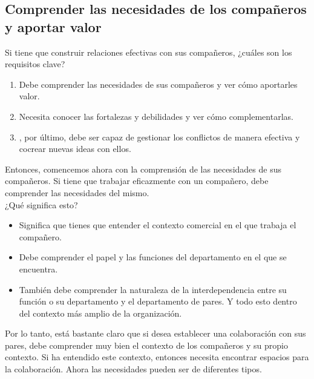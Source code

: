 \documentclass[10pt]{book}
\begin{document}
\subsection{Comprender las necesidades de los compañeros y aportar valor}
Si tiene que construir relaciones efectivas con sus compañeros, ¿cuáles son los requisitos clave?
\begin{enumerate}[\bfseries I.]
\item Debe comprender las necesidades de sus compañeros y ver cómo aportarles valor.
\item Necesita conocer las fortalezas y debilidades y ver cómo complementarlas.
\item , por último, debe ser capaz de gestionar los conflictos de manera efectiva y cocrear nuevas ideas con ellos.
\end{enumerate}
Entonces, comencemos ahora con la comprensión de las necesidades de sus compañeros. Si tiene que trabajar eficazmente con un compañero, debe comprender las necesidades del mismo.\\
¿Qué significa esto?\\
\begin{itemize}
\item Significa que tienes que entender el contexto comercial en el que trabaja el compañero.  
\item Debe comprender el papel y las funciones del departamento en el que se encuentra. 
\item También debe comprender la naturaleza de la interdependencia entre su función o su departamento y el departamento de pares. Y todo esto dentro del contexto más amplio de la organización.
\end{itemize}
Por lo tanto, está bastante claro que si desea establecer una colaboración con sus pares, debe comprender muy bien el contexto de los compañeros y su propio contexto. Si ha entendido este contexto, entonces necesita encontrar espacios para la colaboración. Ahora las necesidades pueden ser de diferentes tipos.\\
\end{document}
